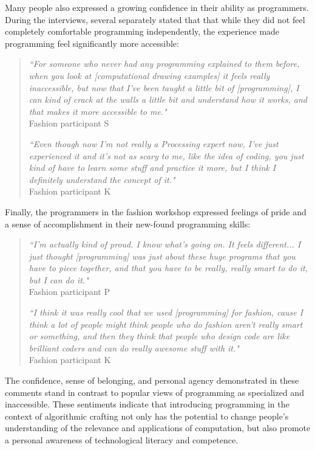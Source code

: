 Many people also expressed a growing confidence in their ability as programmers. During the interviews, several separately stated that that while they did not feel completely comfortable programming independently, the experience made programming feel significantly more accessible:
\begin{quotation}
\textit{``For someone who never had any programming explained to them before, when you look at [computational drawing examples] it feels really inaccessible, but now that I've been taught a little bit of [programming], I can kind of crack at the walls a little bit and understand how it works, and that makes it more accessible to me."}
\\Fashion participant S

\textit{``Even though now I'm not really a Processing expert now, I've just experienced it and it's not as scary to me, like the idea of coding, you just kind of have to learn some stuff and practice it more, but I think I definitely understand the concept of it."}
\\Fashion participant K
\end{quotation}
Finally, the programmers in the fashion workshop expressed feelings of pride and a sense of accomplishment in their new-found programming skills:
\begin{quotation}
\textit{``I'm actually kind of proud. I know what's going on. It feels different... I just thought [programming] was just about these huge programs that you have to piece together, and that you have to be really, really smart to do it, but I can do it."}
\\Fashion participant P

\textit{``I think it was really cool that we used [programming] for fashion, cause I think a lot of people might think people who do fashion aren't really smart or something, and then they think that people who design code are like brilliant coders and can do really awesome stuff with it."}
\\Fashion participant K
\end{quotation}

 The confidence, sense of belonging, and personal agency demonstrated in these comments stand in contrast to popular views of programming as specialized and inaccessible. These sentiments indicate that introducing programming in the context of algorithmic crafting not only has the potential to change people's understanding of the relevance and applications of computation, but also promote a personal awareness of technological literacy and competence. 
 

